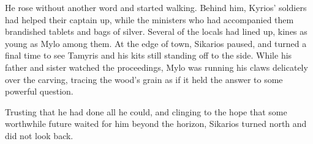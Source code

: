 He rose without another word and started walking. Behind him, Kyrios' soldiers had helped their captain up, while the ministers who had accompanied them brandished tablets and bags of silver. Several of the locals had lined up, kines as young as Mylo among them. At the edge of town, Sikarios paused, and turned a final time to see Tamyris and his kits still standing off to the side. While his father and sister watched the proceedings, Mylo was running his claws delicately over the carving, tracing the wood's grain as if it held the answer to some powerful question.

Trusting that he had done all he could, and clinging to the hope that some worthwhile future waited for him beyond the horizon, Sikarios turned north and did not look back.
